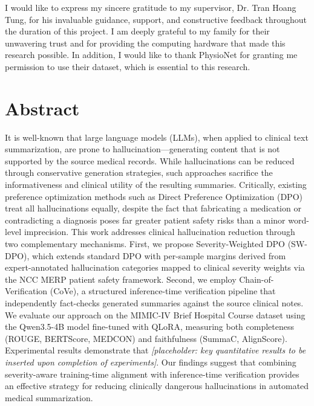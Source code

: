 \documentclass[12pt,a4paper,oneside]{report}
\begin{document}
I would like to express my sincere gratitude to my supervisor, Dr. Tran Hoang Tung, for his invaluable guidance, support, and constructive feedback throughout the duration of this project. I am deeply grateful to my family for their unwavering trust and for providing the computing hardware that made this research possible. In addition, I would like to thank PhysioNet for granting me permission to use their dataset, which is essential to this research.

\chapter*{Abstract}

It is well-known that large language models (LLMs), when applied to clinical text summarization, are prone to hallucination---generating content that is not supported by the source medical records. While hallucinations can be reduced through conservative generation strategies, such approaches sacrifice the informativeness and clinical utility of the resulting summaries. Critically, existing preference optimization methods such as Direct Preference Optimization (DPO) treat all hallucinations equally, despite the fact that fabricating a medication or contradicting a diagnosis poses far greater patient safety risks than a minor word-level imprecision. This work addresses clinical hallucination reduction through two complementary mechanisms. First, we propose Severity-Weighted DPO (SW-DPO), which extends standard DPO with per-sample margins derived from expert-annotated hallucination categories mapped to clinical severity weights via the NCC MERP patient safety framework. Second, we employ Chain-of-Verification (CoVe), a structured inference-time verification pipeline that independently fact-checks generated summaries against the source clinical notes. We evaluate our approach on the MIMIC-IV Brief Hospital Course dataset using the Qwen3.5-4B model fine-tuned with QLoRA, measuring both completeness (ROUGE, BERTScore, MEDCON) and faithfulness (SummaC, AlignScore). Experimental results demonstrate that \textit{[placeholder: key quantitative results to be inserted upon completion of experiments]}. Our findings suggest that combining severity-aware training-time alignment with inference-time verification provides an effective strategy for reducing clinically dangerous hallucinations in automated medical summarization.
\end{document}
